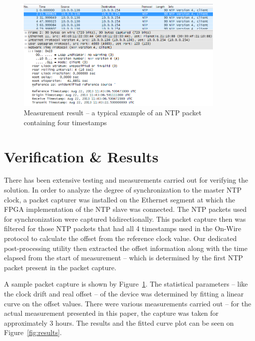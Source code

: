 \documentclass[journal]{IEEEtran}
\begin{document}
\begin{figure}[!htb]
    \centering
    \includegraphics[width=0.9\textwidth]{figures_raw/pcap-NTP.png}
    \caption{Measurement result -- a typical example of an NTP packet containing four timestamps}
    \label{fig:pcap-NTP}
\end{figure}

\section{Verification \& Results}


There has been extensive testing and measurements carried out for verifying the solution. In order to analyze the degree of
synchronization to the master NTP clock, a packet capturer was installed on the Ethernet
segment at which the FPGA implementation of the NTP slave was connected. The NTP packets used for synchronization were
captured bidirectionally. This packet capture then was filtered for those NTP packets that had all 4 timestamps used in
the On-Wire protocol to calculate the offset from the reference clock value. Our  dedicated post-processing utility then extracted the
offset information along with the time elapsed from the start of measurement -- which is determined by
the
first NTP packet present in the packet capture.

A sample packet capture is shown by Figure~\ref{fig:pcap-NTP}. The statistical parameters -- like the clock drift and real
offset -- of the device was determined by
fitting a linear curve on the offset values. There were various measurements carried out -- for the actual measurement presented in this paper, the capture was taken
for approximately 3 hours.
The results and the fitted curve plot can be seen on Figure~\ref{fig:results}.
\end{document}
